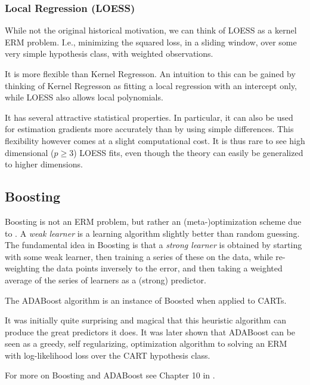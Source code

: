 \subsubsection{Local Regression (LOESS)}
\label{sec:loess}

While not the original historical motivation, we can think of LOESS as a kernel ERM problem. 
I.e., minimizing the squared loss, in a sliding window, over some very simple hypothesis class, with weighted observations.

It is more flexible than Kernel Regresson.
An intuition to this can be gained by thinking of Kernel Regresson as fitting a local regression with an intercept only, while LOESS also allows local polynomials.

It has several attractive statistical properties. In particular, it can also be used for estimation gradients more accurately than by using simple differences. 
This flexibility however comes at a slight computational cost. 
It is thus rare to see high dimensional ($p \geq 3$) LOESS fits, even though the theory can easily be generalized to higher dimensions.




\subsection{Boosting}
\label{sec:boosting}

Boosting is not an ERM problem, but rather an (meta-)optimization scheme due to \cite{schapire_strength_1990}.
A \emph{weak learner} is a learning algorithm slightly better than random guessing. 
The fundamental idea in Boosting is that a \emph{strong learner} is obtained by starting with some weak learner, then training a series of these on the data, while re-weighting the data points inversely to the error, and then taking a weighted average of the series of learners as a (strong) predictor.

The ADABoost algorithm \citep{freund_decision-theoretic_1997} is an instance of Boosted when applied to CARTs.

It was initially quite surprising and magical that this heuristic algorithm can produce the great predictors it does. 
It was later shown that ADABoost can be seen as a greedy, self regularizing, optimization algorithm to solving an ERM with log-likelihood loss \citep{friedman_additive_2000} over the CART hypothesis class.

For more on Boosting and ADABoost see Chapter 10 in \cite{hastie_elements_2003}.




